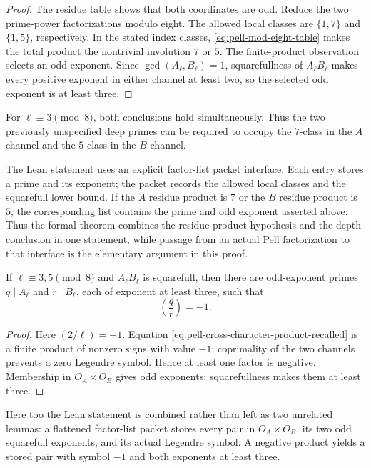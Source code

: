 \begin{proof}
The residue table shows that both coordinates are odd.  Reduce the two
prime-power factorizations modulo eight.  The allowed local
classes are $\{1,7\}$ and $\{1,5\}$, respectively.  In the stated index
classes, \eqref{eq:pell-mod-eight-table} makes the total product the
nontrivial involution $7$ or $5$.  The finite-product observation selects an
odd exponent.  Since $\gcd(A_\ell,B_\ell)=1$, squarefullness of
$A_\ell B_\ell$ makes every positive exponent in either channel at least
two, so the selected odd exponent is at least three.
\end{proof}

For $\ell\equiv3\pmod8$, both conclusions hold simultaneously.  Thus the
two previously unspecified deep primes can be required to occupy the
$7$-class in the $A$ channel and the $5$-class in the $B$ channel.

The Lean statement uses an explicit factor-list packet interface.  Each
entry stores a prime and its exponent; the packet records the allowed local
classes and the squarefull lower bound.  If the $A$ residue product is $7$
or the $B$ residue product is $5$, the corresponding list contains the
prime and odd exponent asserted above.  Thus the formal theorem combines
the residue-product hypothesis and the depth conclusion in one statement,
while passage from an actual Pell factorization to that interface is the
elementary argument in this proof.

\begin{theorem}
\label{thm:pell-forced-cross-nonresidue}
If $\ell\equiv3,5\pmod8$ and $A_\ell B_\ell$ is squarefull, then there are
odd-exponent primes $q\mid A_\ell$ and $r\mid B_\ell$, each of exponent at
least three, such that
\[
                            \left(\frac qr\right)=-1.
\]
\end{theorem}

\begin{proof}
Here $(2/\ell)=-1$.  Equation
\eqref{eq:pell-cross-character-product-recalled} is a finite product of
nonzero signs with value $-1$: coprimality of the two channels prevents a
zero Legendre symbol.  Hence at least one factor is negative.  Membership in
$O_A\times O_B$ gives odd exponents; squarefullness makes them at least
three.
\end{proof}

Here too the Lean statement is combined rather than left as two unrelated
lemmas: a flattened factor-list packet stores every pair in
$O_A\times O_B$, its two odd squarefull exponents, and its actual Legendre
symbol.  A negative product yields a stored pair with symbol $-1$ and both
exponents at least three.

